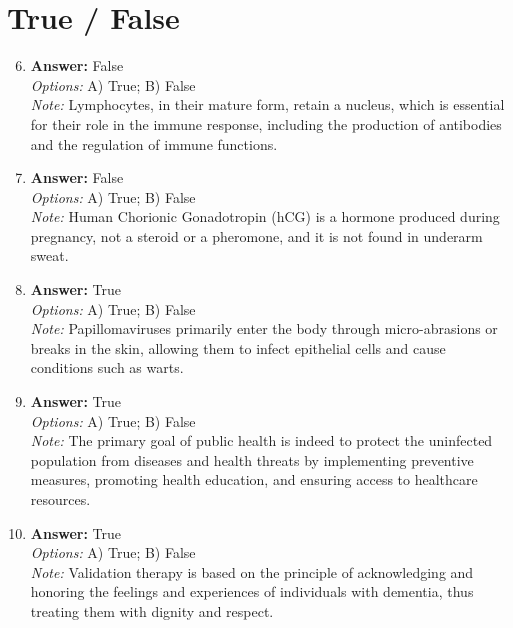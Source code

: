 \documentclass[12pt]{article}
\begin{document}
\section*{True / False}
\begin{enumerate}[label=\arabic*.]
\setcounter{enumi}{5}
\item \textbf{Answer:} False
\\ \textit{Options:} A) True; B) False
\\ \textit{Note:} Lymphocytes, in their mature form, retain a nucleus, which is essential for their role in the immune response, including the production of antibodies and the regulation of immune functions.
\item \textbf{Answer:} False
\\ \textit{Options:} A) True; B) False
\\ \textit{Note:} Human Chorionic Gonadotropin (hCG) is a hormone produced during pregnancy, not a steroid or a pheromone, and it is not found in underarm sweat.
\item \textbf{Answer:} True
\\ \textit{Options:} A) True; B) False
\\ \textit{Note:} Papillomaviruses primarily enter the body through micro-abrasions or breaks in the skin, allowing them to infect epithelial cells and cause conditions such as warts.
\item \textbf{Answer:} True
\\ \textit{Options:} A) True; B) False
\\ \textit{Note:} The primary goal of public health is indeed to protect the uninfected population from diseases and health threats by implementing preventive measures, promoting health education, and ensuring access to healthcare resources.
\item \textbf{Answer:} True
\\ \textit{Options:} A) True; B) False
\\ \textit{Note:} Validation therapy is based on the principle of acknowledging and honoring the feelings and experiences of individuals with dementia, thus treating them with dignity and respect.
\end{enumerate}
\end{document}
